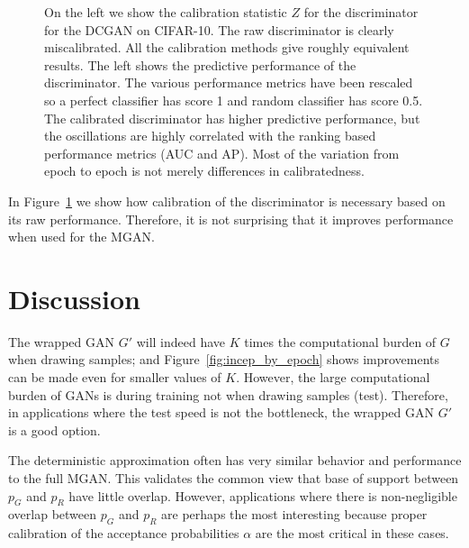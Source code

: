 \documentclass{article}
\newcommand{\PG}{{p_G}}
\newcommand{\PR}{{p_R}}
\newcommand{\accept}{\alpha}
\begin{document}
\begin{figure}
{{    On the left we show the calibration statistic $Z$ for the discriminator for the DCGAN on CIFAR-10.
    The raw discriminator is clearly miscalibrated.
    All the calibration methods give roughly equivalent results.
    The left shows the predictive performance of the discriminator.
    The various performance metrics have been rescaled so a perfect classifier has score 1 and random classifier has score 0.5.
    The calibrated discriminator has higher predictive performance, but the oscillations are highly correlated with the ranking based performance metrics (AUC and AP)\@.
    Most of the variation from epoch to epoch is not merely differences in calibratedness.
    }}
    \label{fig:calibration}
\end{figure}

In Figure~\ref{fig:calibration} we show how calibration of the discriminator is necessary based on its raw performance.
Therefore, it is not surprising that it improves performance when used for the MGAN\@.


\section{Discussion}

The wrapped GAN $G'$ will indeed have $K$ times the computational burden of $G$ when drawing samples; and Figure~\ref{fig:incep_by_epoch} shows improvements can be made even for smaller values of $K$.
However, the large computational burden of GANs is during training not when drawing samples (test)\@.
Therefore, in applications where the test speed is not the bottleneck, the wrapped GAN $G'$ is a good option.

The deterministic approximation often has very similar behavior and performance to the full MGAN\@.
This validates the common view that base of support between $\PG$ and $\PR$ have little overlap.
However, applications where there is non-negligible overlap between $\PG$ and $\PR$ are perhaps the most interesting because proper calibration of the acceptance probabilities $\accept$ are the most critical in these cases.
\end{document}
